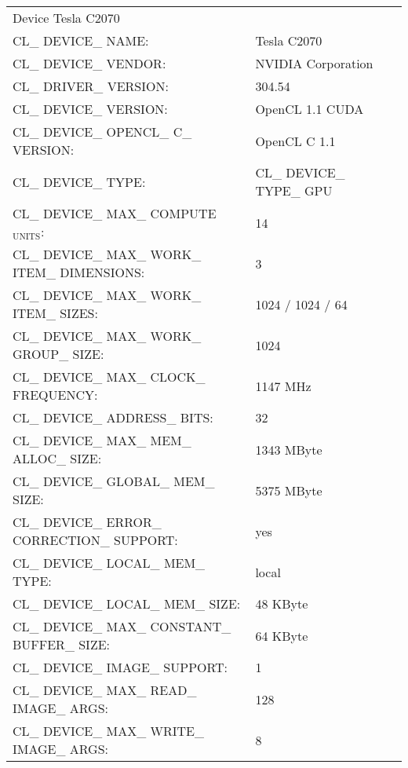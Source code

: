 \documentclass{scrartcl}
\begin{document}
\begin{center}
\begin{tabular}{lll}
 Device Tesla C2070                                       &                                  &     \\
 CL\_{} DEVICE\_{} NAME:                                  &  Tesla C2070                     &     \\
 CL\_{} DEVICE\_{} VENDOR:                                &  NVIDIA Corporation              &     \\
 CL\_{} DRIVER\_{} VERSION:                               &  304.54                          &     \\
 CL\_{} DEVICE\_{} VERSION:                               &  OpenCL 1.1 CUDA                 &     \\
 CL\_{} DEVICE\_{} OPENCL\_{} C\_{} VERSION:              &  OpenCL C 1.1                    &     \\
 CL\_{} DEVICE\_{} TYPE:                                  &  CL\_{} DEVICE\_{} TYPE\_{} GPU  &     \\
 CL\_{} DEVICE\_{} MAX\_{}  COMPUTE$_{\mathrm{UNITS}}$:   &  14                              &     \\
 CL\_{} DEVICE\_{} MAX\_{} WORK\_{} ITEM\_{} DIMENSIONS:  &  3                               &     \\
 CL\_{} DEVICE\_{} MAX\_{} WORK\_{} ITEM\_{} SIZES:       &  1024 / 1024 / 64                &     \\
 CL\_{} DEVICE\_{} MAX\_{} WORK\_{} GROUP\_{} SIZE:       &  1024                            &     \\
 CL\_{} DEVICE\_{} MAX\_{} CLOCK\_{} FREQUENCY:           &  1147 MHz                        &     \\
 CL\_{} DEVICE\_{} ADDRESS\_{} BITS:                      &  32                              &     \\
 CL\_{} DEVICE\_{} MAX\_{} MEM\_{} ALLOC\_{} SIZE:        &  1343 MByte                      &     \\
 CL\_{} DEVICE\_{} GLOBAL\_{} MEM\_{} SIZE:               &  5375 MByte                      &     \\
 CL\_{} DEVICE\_{} ERROR\_{} CORRECTION\_{} SUPPORT:      &  yes                             &     \\
 CL\_{} DEVICE\_{} LOCAL\_{} MEM\_{} TYPE:                &  local                           &     \\
 CL\_{} DEVICE\_{} LOCAL\_{} MEM\_{} SIZE:                &  48 KByte                        &     \\
 CL\_{} DEVICE\_{} MAX\_{} CONSTANT\_{} BUFFER\_{} SIZE:  &  64 KByte                        &     \\
 CL\_{} DEVICE\_{} IMAGE\_{} SUPPORT:                     &  1                               &     \\
 CL\_{} DEVICE\_{} MAX\_{} READ\_{} IMAGE\_{} ARGS:       &  128                             &     \\
 CL\_{} DEVICE\_{} MAX\_{} WRITE\_{} IMAGE\_{} ARGS:      &  8                               &     \\
\end{tabular}
\end{center}
\end{document}
